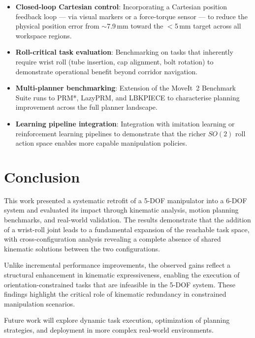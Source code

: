 \documentclass[conference]{IEEEtran}
\begin{document}
	\begin{itemize}
		\item \textbf{Closed-loop Cartesian control}: Incorporating a
		Cartesian position feedback loop --- via visual markers or a
		force-torque sensor --- to reduce the physical position error
		from $\sim$7.9\,mm toward the $<$5\,mm target across all
		workspace regions.
		
		\item \textbf{Roll-critical task evaluation}: Benchmarking on
		tasks that inherently require wrist roll (tube insertion, cap
		alignment, bolt rotation) to demonstrate operational benefit
		beyond corridor navigation.
		
		\item \textbf{Multi-planner benchmarking}: Extension of the
		MoveIt~2 Benchmark Suite runs to PRM*, LazyPRM, and LBKPIECE
		to characterise planning improvement across the full planner
		landscape.
		
		\item \textbf{Learning pipeline integration}: Integration with
		imitation learning or reinforcement learning pipelines to
		demonstrate that the richer $SO(2)$ roll action space enables
		more capable manipulation policies.
		
	\end{itemize}
	
	
	\section{Conclusion}
	\label{sec:conclusion}
	
	This work presented a systematic retrofit of a 5-DOF manipulator into
	a 6-DOF system and evaluated its impact through kinematic analysis,
	motion planning benchmarks, and real-world validation. The results
	demonstrate that the addition of a wrist-roll joint leads to a
	fundamental expansion of the reachable task space, with
	cross-configuration analysis revealing a complete absence of shared
	kinematic solutions between the two configurations.
	
	Unlike incremental performance improvements, the observed gains reflect
	a structural enhancement in kinematic expressiveness, enabling the
	execution of orientation-constrained tasks that are infeasible in the
	5-DOF system. These findings highlight the critical role of kinematic
	redundancy in constrained manipulation scenarios.
	
	Future work will explore dynamic task execution, optimization of
	planning strategies, and deployment in more complex real-world
	environments.
	
	
	
	
	
\end{document}
